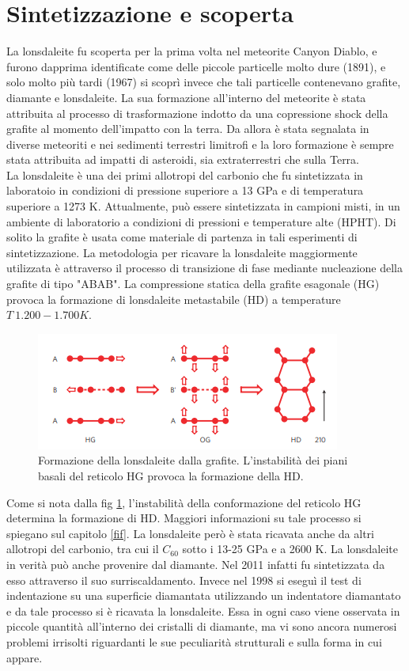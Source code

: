 \documentclass[a4paper,titlepage]{book}
\begin{document}
\section{Sintetizzazione e scoperta}
La lonsdaleite fu scoperta per la prima volta nel meteorite Canyon Diablo, e furono dapprima identificate come delle piccole particelle molto dure (1891), e solo molto più tardi (1967) si scoprì invece che tali particelle contenevano grafite, diamante e lonsdaleite. 
La sua formazione all'interno del meteorite è stata attribuita al processo di trasformazione indotto da una copressione shock della grafite al momento dell'impatto con la terra. Da allora è stata segnalata in diverse meteoriti e nei sedimenti terrestri limitrofi e la loro formazione è sempre stata attribuita ad impatti di asteroidi, sia extraterrestri che sulla Terra. \\

La lonsdaleite è una dei primi allotropi del carbonio che fu sintetizzata in laboratoio in condizioni di pressione superiore a 13 GPa e di temperatura superiore a 1273 K.
Attualmente, può essere sintetizzata in campioni misti, in un ambiente di laboratorio a condizioni di pressioni e temperature alte (HPHT). Di solito la grafite è usata come materiale di partenza in tali esperimenti di sintetizzazione. 
La metodologia per ricavare la lonsdaleite maggiormente utilizzata è attraverso il processo di transizione di fase mediante nucleazione della grafite di tipo "ABAB".
La compressione statica della grafite esagonale (HG) provoca la formazione di lonsdaleite metastabile (HD) a temperature $T ~ 1.200-1.700 K$.
\begin{figure}[h!] 
	\centering
	\includegraphics[width=0.7\columnwidth]{formlonsdaleite.png}
	\caption{ 	\label{lon}
		Formazione della lonsdaleite dalla grafite. 
		L'instabilità dei piani basali del reticolo HG provoca la formazione della HD.
	}
\end{figure}
Come si nota dalla fig \ref{lon}, l'instabilità della conformazione del reticolo HG determina la formazione di HD. Maggiori informazioni su tale processo si spiegano sul capitolo \ref{fif}.
La lonsdaleite però è stata ricavata anche da altri allotropi del carbonio, tra cui il $C_{60}$ sotto i 13-25 GPa e a 2600 K.
La lonsdaleite in verità può anche provenire dal diamante. Nel 2011 infatti fu sintetizzata da esso attraverso il suo surriscaldamento. Invece nel 1998 si eseguì il test di indentazione su una superficie diamantata utilizzando un indentatore diamantato e da tale processo si è ricavata la lonsdaleite. Essa in ogni caso viene osservata in piccole quantità all'interno dei cristalli di diamante, ma vi sono ancora numerosi problemi irrisolti riguardanti le sue peculiarità strutturali e sulla forma in cui appare. 
\end{document}
